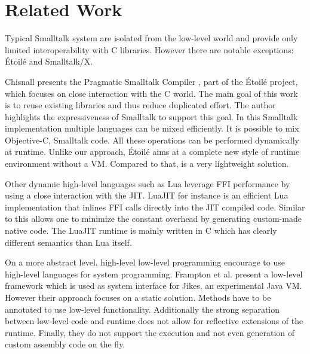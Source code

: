 
\section{Related Work}



Typical Smalltalk system are isolated from the low-level world and provide only limited interoperability with C libraries.
However there are notable exceptions: Étoilé and Smalltalk/X.

Chisnall presents the Pragmatic Smalltalk Compiler \cite{Chis12a}, part of the Étoilé project, which focuses on close interaction with the C world.
The main goal of this work is to reuse existing libraries and thus reduce duplicated effort.
The author highlights the expressiveness of Smalltalk to support this goal.
In this Smalltalk implementation multiple languages can be mixed efficiently.
It is possible to mix Objective-C, Smalltalk code.
All these operations can be performed dynamically at runtime.
Unlike our approach, Étoilé aims at a complete new style of runtime environment without a VM. Compared to that, \NB is a very lightweight solution.


Other dynamic high-level languages such as Lua leverage FFI performance by using a close interaction with the JIT.
LuaJIT \cite{luaffi} for instance is an efficient Lua implementation that inlines FFI calls directly into the JIT compiled code.
Similar to \NB this allows one to minimize the constant overhead by generating custom-made native code.
The LuaJIT runtime is mainly written in C which has clearly different semantics than Lua itself.


On a more abstract level, high-level low-level programming \cite{Fram09a} encourage to use high-level languages for system programming.
Frampton et al. present a low-level framework  which is used as system interface for Jikes, an experimental Java VM.
However their approach focuses on a static solution.
Methods have to be annotated to use low-level functionality.
Additionally the strong separation between low-level code and runtime does not allow for reflective extensions of the runtime.
Finally, they do not support the execution and not even generation of custom assembly code on the fly.



